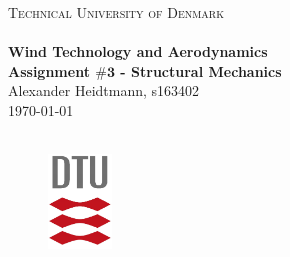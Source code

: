 \begin{titlepage}

\begin{center}
\textsc{\LARGE Technical University of Denmark}\\[1.5cm]

\HRule \\
{\Large \bfseries Wind Technology and Aerodynamics \\
\large \bfseries Assignment $\mathbf{\#3}$ - Structural Mechanics}\\[1cm]
Alexander Heidtmann, s163402 \\
\today \\
\HRule \\[1cm]

\vspace{0.5cm}

\hspace{1cm}
\begin{center}
\end{center}
\hspace{3cm}

\vfill

\noindent
\begin{figure}[h!]
\centering
\includegraphics[width=0.15\textwidth]{setup/DTU.PNG}
\end{figure}
\end{center}
\end{titlepage}